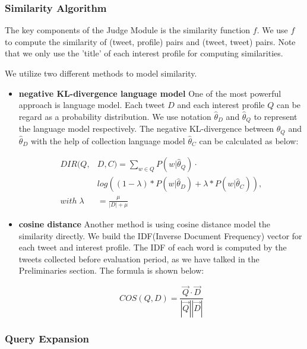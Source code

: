 \subsubsection{Similarity Algorithm}

The key components of the Judge Module is the similarity function $f$.
We use $f$ to compute the similarity of (tweet, profile) pairs and (tweet, tweet) pairs.
Note that we only use the 'title' of each interest profile for computing similarities.
 
We utilize two different methods to model similarity.

\begin{itemize}
\item \textbf{negative KL-divergence language model}
One of the most powerful approach is language model. 
Each tweet $D$ and each interest profile $Q$ can be regard as a probability distribution.
We use notation $\widehat{\theta}_D$ and $\widehat{\theta}_Q$ to represent the language model respectively.
The negative KL-divergence between $\widehat{\theta}_Q$ and $\widehat{\theta}_D$ with the help of
collection language model $\widehat{\theta}_C$ can be calculated as below:

\begin{equation}
\begin{aligned}
DIR(Q,&D,C) = \sum_{w \in Q} P(w|\widehat{\theta}_Q) \cdot \\
&log \left( (1-\lambda) * P(w|\widehat{\theta}_D) + \lambda * P(w|\widehat{\theta}_C) \right), \\
with\; \lambda &= \frac{\mu}{|D| + \mu}
\end{aligned}
\end{equation}

\item \textbf{cosine distance}
Another method is using cosine distance model the similarity directly.
We build the IDF(Inverse Document Frequency) vector for each tweet and interest profile.
The IDF of each word is computed by the tweets collected before evaluation period,
as we have talked in the Preliminaries section.
The formula is shown below:

\begin{equation}
COS(Q,D) = \frac{\vec{Q} \cdot \vec{D}}{|\vec{Q}||\vec{D}|}
\end{equation}

\end{itemize}

\subsubsection{Query Expansion}

